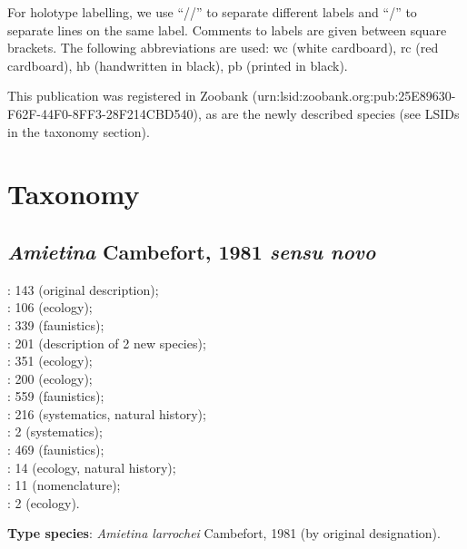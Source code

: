 \documentclass[fleqn,10pt,lineno]{wlpeerj}
\begin{document}
For holotype labelling, we use “//” to separate different labels and “/” to separate lines on the same label. Comments to labels are given between square brackets. The following abbreviations are used: wc (white cardboard), rc (red cardboard), hb (handwritten in black), pb (printed in black).

This publication was registered in Zoobank (urn:lsid:zoobank.org:pub:25E89630-F62F-44F0-8FF3-28F214CBD540), as are the newly described species (see LSIDs in the taxonomy section).


\section*{Taxonomy}

\subsection*{\textit{Amietina} Cambefort, 1981 \textit{sensu novo}}

\cite{cambefort1981amietina}: 143 (original description);\\
\cite{cambefort1984etude}: 106 (ecology);\\
\cite{cambefort1985coleopteres}: 339 (faunistics);\\
\cite{branco1989deux}: 201 (description of 2 new species);\\
\cite{nummelin1989dung}: 351 (ecology);\\
\cite{cambefort1991dung}: 200 (ecology);\\
\cite{cambefort2003nimba}: 559 (faunistics);\\
\cite{davis2008african}: 216 (systematics, natural history);\\
\cite{josso2008unidentis}: 2 (systematics);\\
\cite{moretto2010bayanga}: 469 (faunistics);\\
\cite{moretto2010onthophagus}: 14 (ecology, natural history);\\
\cite{branco2014scarabaeidae}: 11 (nomenclature);\\
\cite{philips2023dung}: 2 (ecology).


\textbf{Type species}: \textit{Amietina larrochei} Cambefort, 1981 (by original designation).
\end{document}

